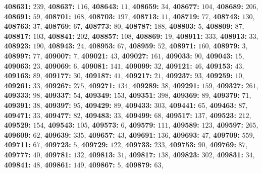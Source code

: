 \textsf{\bfseries 408631:} $239$, \textsf{\bfseries 408637:} $116$, \textsf{\bfseries 408643:} $11$, \textsf{\bfseries 408659:} $34$, \textsf{\bfseries 408677:} $104$, \textsf{\bfseries 408689:} $206$, \textsf{\bfseries 408691:} $59$, \textsf{\bfseries 408701:} $168$, \textsf{\bfseries 408703:} $197$, \textsf{\bfseries 408713:} $11$, \textsf{\bfseries 408719:} $77$, \textsf{\bfseries 408743:} $130$, \textsf{\bfseries 408763:} $37$, \textsf{\bfseries 408769:} $67$, \textsf{\bfseries 408773:} $80$, \textsf{\bfseries 408787:} $188$, \textsf{\bfseries 408803:} $5$, \textsf{\bfseries 408809:} $87$, \textsf{\bfseries 408817:} $103$, \textsf{\bfseries 408841:} $202$, \textsf{\bfseries 408857:} $108$, \textsf{\bfseries 408869:} $19$, \textsf{\bfseries 408911:} $333$, \textsf{\bfseries 408913:} $33$, \textsf{\bfseries 408923:} $190$, \textsf{\bfseries 408943:} $24$, \textsf{\bfseries 408953:} $67$, \textsf{\bfseries 408959:} $52$, \textsf{\bfseries 408971:} $160$, \textsf{\bfseries 408979:} $3$, \textsf{\bfseries 408997:} $77$, \textsf{\bfseries 409007:} $7$, \textsf{\bfseries 409021:} $43$, \textsf{\bfseries 409027:} $161$, \textsf{\bfseries 409033:} $90$, \textsf{\bfseries 409043:} $15$, \textsf{\bfseries 409063:} $23$, \textsf{\bfseries 409069:} $6$, \textsf{\bfseries 409081:} $141$, \textsf{\bfseries 409099:} $32$, \textsf{\bfseries 409121:} $46$, \textsf{\bfseries 409153:} $43$, \textsf{\bfseries 409163:} $89$, \textsf{\bfseries 409177:} $30$, \textsf{\bfseries 409187:} $41$, \textsf{\bfseries 409217:} $21$, \textsf{\bfseries 409237:} $93$, \textsf{\bfseries 409259:} $10$, \textsf{\bfseries 409261:} $33$, \textsf{\bfseries 409267:} $275$, \textsf{\bfseries 409271:} $134$, \textsf{\bfseries 409289:} $38$, \textsf{\bfseries 409291:} $159$, \textsf{\bfseries 409327:} $261$, \textsf{\bfseries 409333:} $98$, \textsf{\bfseries 409337:} $54$, \textsf{\bfseries 409349:} $153$, \textsf{\bfseries 409351:} $398$, \textsf{\bfseries 409369:} $89$, \textsf{\bfseries 409379:} $71$, \textsf{\bfseries 409391:} $38$, \textsf{\bfseries 409397:} $95$, \textsf{\bfseries 409429:} $89$, \textsf{\bfseries 409433:} $303$, \textsf{\bfseries 409441:} $65$, \textsf{\bfseries 409463:} $87$, \textsf{\bfseries 409471:} $33$, \textsf{\bfseries 409477:} $82$, \textsf{\bfseries 409483:} $33$, \textsf{\bfseries 409499:} $68$, \textsf{\bfseries 409517:} $137$, \textsf{\bfseries 409523:} $212$, \textsf{\bfseries 409529:} $154$, \textsf{\bfseries 409543:} $105$, \textsf{\bfseries 409573:} $6$, \textsf{\bfseries 409579:} $111$, \textsf{\bfseries 409589:} $123$, \textsf{\bfseries 409597:} $265$, \textsf{\bfseries 409609:} $62$, \textsf{\bfseries 409639:} $335$, \textsf{\bfseries 409657:} $43$, \textsf{\bfseries 409691:} $136$, \textsf{\bfseries 409693:} $47$, \textsf{\bfseries 409709:} $559$, \textsf{\bfseries 409711:} $67$, \textsf{\bfseries 409723:} $5$, \textsf{\bfseries 409729:} $122$, \textsf{\bfseries 409733:} $233$, \textsf{\bfseries 409753:} $90$, \textsf{\bfseries 409769:} $87$, \textsf{\bfseries 409777:} $40$, \textsf{\bfseries 409781:} $132$, \textsf{\bfseries 409813:} $31$, \textsf{\bfseries 409817:} $138$, \textsf{\bfseries 409823:} $302$, \textsf{\bfseries 409831:} $34$, \textsf{\bfseries 409841:} $48$, \textsf{\bfseries 409861:} $149$, \textsf{\bfseries 409867:} $5$, \textsf{\bfseries 409879:} $63$, 
